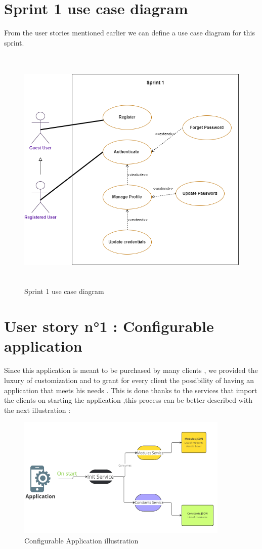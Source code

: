 \section{Sprint 1 use case diagram}
From the user stories mentioned earlier we can define a use case diagram for this sprint.
\begin{figure}[H] \includegraphics[height=12cm]{images/chap2/Sprint1UC.png}
    \caption{Sprint 1 use case diagram}
    \label{fig:enter-label}
\end{figure}


\section{User story n°1 : Configurable application}
Since this application is meant to be purchased by many clients , we provided the luxury of customization and to grant for every client the possibility of having an application that meets his needs .
This is done thanks to the services that import the clients on starting the application ,this process can be better described with the next illustration :

\begin{figure}[H] \includegraphics[width=0.90\textwidth]{images/chap2/config.png}
    \caption{Configurable Application illustration}
    \label{fig:enter-label}
\end{figure}

